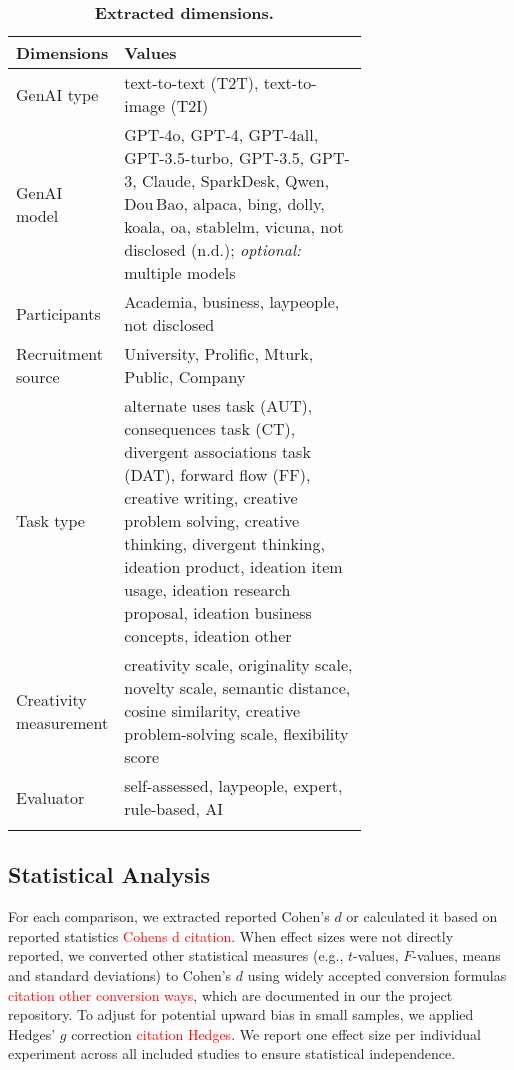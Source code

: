 \documentclass[manuscript, screen, review, acmsmall, anonymous]{acmart}
\newcommand{\TODO}[1]{\textcolor{red}{#1}}
\begin{document}
\begin{table}[H]
  \centering
  \caption{\textbf{Extracted dimensions.}\label{tab:variables}}
  \vspace{-0.4cm}
  \footnotesize
  \begin{tabular}{@{\extracolsep{\fill}} l  p{0.7\linewidth} }
    \toprule
    \textbf{Dimensions} & \textbf{Values} \\
    \midrule
    GenAI type & text-to-text (T2T), text-to-image (T2I) \\
    \midrule
    GenAI model & GPT-4o, GPT-4, GPT-4all, GPT-3.5-turbo, GPT-3.5, GPT-3, Claude, SparkDesk, Qwen, Dou\,Bao, alpaca, bing, dolly, koala, oa, stablelm, vicuna, not disclosed (n.d.); \textit{optional:} multiple models \\
    \midrule
    Participants & Academia, business, laypeople, not disclosed \\
    \midrule
    Recruitment source & University, Prolific, Mturk, Public, Company \\
    \midrule
    Task type & alternate uses task (AUT), consequences task (CT), divergent associations task (DAT), forward flow (FF), creative writing, creative problem solving, creative thinking, divergent thinking, ideation product, ideation item usage, ideation research proposal, ideation business concepts, ideation other\\
    \midrule
    Creativity measurement & creativity scale, originality scale, novelty scale, semantic distance, cosine similarity, creative problem-solving scale, flexibility score \\
     \midrule
    Evaluator & self-assessed, laypeople, expert, rule-based, AI \\
    \addlinespace
    \bottomrule
  \end{tabular}
\end{table}

\subsection{Statistical Analysis}
\label{sec:StatAnalysis}

For each comparison, we extracted reported Cohen's $d$ or calculated it based on reported statistics \TODO{Cohens d citation}. When effect sizes were not directly reported, we converted other statistical measures (e.g., $t$-values, $F$-values, means and standard deviations) to Cohen's $d$ using widely accepted conversion formulas \TODO{citation other conversion ways}, which are documented in our the project repository. To adjust for potential upward bias in small samples, we applied Hedges' $g$ correction \cite{Hedges1985}\TODO{citation Hedges}. We report one effect size per individual experiment across all included studies to ensure statistical independence.
\end{document}
